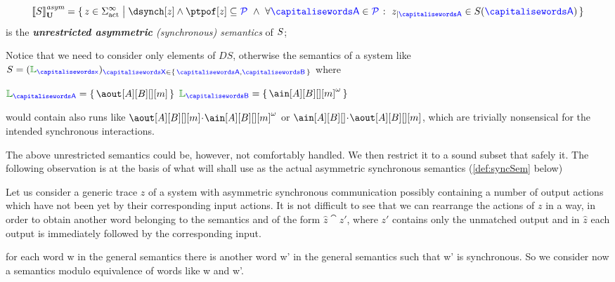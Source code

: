 \begin{definition}
 \[
	 \gasem{\aCS} = \Set{z \in \alfact^\infty \sst \dsynch[z] \land\ptpof[z] \subseteq \ptpset \ \land\ \forall \p \in
		\ptpset \qst \filter{z}{\p} \in \aCS(\p)  }
  \]
  is the \emph{{\bf unrestricted asymmetric} (synchronous) semantics} of $S$;
\end{definition}

Notice that we need to consider only elements of $DS$, otherwise the semantics of a system like
$\aCS = ({\alang}_{\px})_{\ptp[X] \in \Set{\p,\q}}$ where\\
\centerline{$\alang_{\p}= \Set{\aout[A][B][][m]}$ \qquad $\alang_{\q}= \Set{\ain[A][B][][m]^\omega}$ }
would contain also runs like 
$\aout[A][B][][m]\cat\ain[A][B][][m]^\omega$ or $\ain[A][B][]\cat\aout[A][B][][m]$, which are trivially nonsensical for the intended synchronous interactions.


The above unrestricted semantics could be, however, not comfortably handled.
We then restrict it to a sound subset that safely  it. 
The following observation is at the basis of what will shall use as the 
actual asymmetric synchronous semantics (\cref{def:syncSem} below)

Let us consider a generic trace $z$ of a system with asymmetric synchronous communication possibly
containing a number of output actions which have not been  yet by their corresponding
input actions. It is not difficult to see that we can rearrange the actions of $z$ in a  way, in order to obtain another word belonging to the semantics and of the form
$\hat z\cat z'$, where $z'$ contains only the unmatched output and in $\hat z$ each
output is immediately followed by the corresponding input.


for each word w in the general semantics there is another word w' in the general semantics
such that w' is synchronous.
So we consider now a semantics modulo equivalence of words like w and w'.


